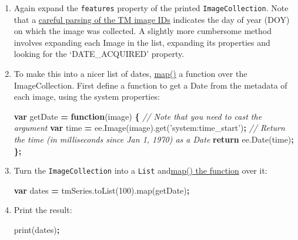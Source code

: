 \documentclass[
]{article}
\newenvironment{Shaded}{\begin{snugshade}}{\end{snugshade}}
\newcommand{\AttributeTok}[1]{\textcolor[rgb]{0.77,0.63,0.00}{#1}}
\newcommand{\CommentTok}[1]{\textcolor[rgb]{0.56,0.35,0.01}{\textit{#1}}}
\newcommand{\ControlFlowTok}[1]{\textcolor[rgb]{0.13,0.29,0.53}{\textbf{#1}}}
\newcommand{\DecValTok}[1]{\textcolor[rgb]{0.00,0.00,0.81}{#1}}
\newcommand{\KeywordTok}[1]{\textcolor[rgb]{0.13,0.29,0.53}{\textbf{#1}}}
\newcommand{\NormalTok}[1]{#1}
\newcommand{\OperatorTok}[1]{\textcolor[rgb]{0.81,0.36,0.00}{\textbf{#1}}}
\newcommand{\StringTok}[1]{\textcolor[rgb]{0.31,0.60,0.02}{#1}}
\newcommand{\VariableTok}[1]{\textcolor[rgb]{0.00,0.00,0.00}{#1}}
\begin{document}
\begin{enumerate}
\def\labelenumi{\arabic{enumi}.}
\item
  Again expand the \texttt{features} property of the printed \texttt{ImageCollection}. Note that a \href{http://landsat.usgs.gov/naming_conventions_scene_identifiers.php}{careful parsing of the TM image IDs} indicates the day of year (DOY) on which the image was collected. A slightly more cumbersome method involves expanding each Image in the list, expanding its properties and looking for the `DATE\_ACQUIRED' property.
\item
  To make this into a nicer list of dates, \href{https://en.wikipedia.org/wiki/Map_(higher-order_function)}{map()} a function over the ImageCollection. First define a function to get a Date from the metadata of each image, using the system properties:

\begin{Shaded}
\begin{Highlighting}[]
\KeywordTok{var}\NormalTok{ getDate }\OperatorTok{=} \KeywordTok{function}\NormalTok{(image) }\OperatorTok{\{}
\CommentTok{// Note that you need to cast the argument}
\KeywordTok{var}\NormalTok{ time }\OperatorTok{=} \VariableTok{ee}\NormalTok{.}\AttributeTok{Image}\NormalTok{(image).}\AttributeTok{get}\NormalTok{(}\StringTok{'system:time_start'}\NormalTok{)}\OperatorTok{;}
\CommentTok{// Return the time (in milliseconds since Jan 1, 1970) as a Date}
\ControlFlowTok{return} \VariableTok{ee}\NormalTok{.}\AttributeTok{Date}\NormalTok{(time)}\OperatorTok{;}
\OperatorTok{\};}
\end{Highlighting}
\end{Shaded}
\item
  Turn the \texttt{ImageCollection} into a \texttt{List} and\href{https://developers.google.com/earth-engine/getstarted\#mapping-what-to-do-instead-of-a-for-loop}{map() the function} over it:

\begin{Shaded}
\begin{Highlighting}[]
\KeywordTok{var}\NormalTok{ dates }\OperatorTok{=} \VariableTok{tmSeries}\NormalTok{.}\AttributeTok{toList}\NormalTok{(}\DecValTok{100}\NormalTok{).}\AttributeTok{map}\NormalTok{(getDate)}\OperatorTok{;}
\end{Highlighting}
\end{Shaded}
\item
  Print the result:

\begin{Shaded}
\begin{Highlighting}[]
\AttributeTok{print}\NormalTok{(dates)}\OperatorTok{;}
\end{Highlighting}
\end{Shaded}
\end{enumerate}
\end{document}
